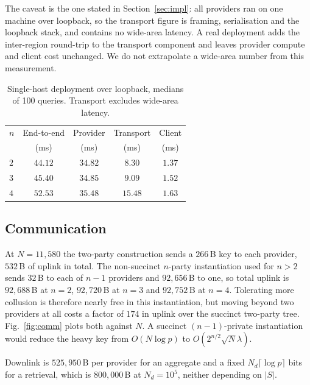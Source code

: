 \documentclass[a4paper,fleqn]{cas-dc}
\begin{document}
The caveat is the one stated in Section~\ref{sec:impl}: all providers ran on
one machine over loopback, so the transport figure is framing, serialisation
and the loopback stack, and contains no wide-area latency. A real deployment
adds the inter-region round-trip to the transport component and leaves
provider compute and client cost unchanged. We do not extrapolate a wide-area
number from this measurement.

\begin{table}[pos=t]
\caption{Single-host deployment over loopback, medians of 100 queries.
Transport excludes wide-area latency.}
\label{tab:wan}
\centering
\footnotesize
\setlength{\tabcolsep}{3pt}
\renewcommand{\arraystretch}{1.2}
\begin{tabular*}{\tblwidth}{@{\extracolsep{\fill}}lcccc@{}}
\toprule
$n$ & End-to-end & Provider & Transport & Client \\
    & (ms)       & (ms)     & (ms)      & (ms) \\
\midrule
$2$ & $44.12$ & $34.82$ & $8.30$  & $1.37$ \\
$3$ & $45.40$ & $34.85$ & $9.09$  & $1.52$ \\
$4$ & $52.53$ & $35.48$ & $15.48$ & $1.63$ \\
\bottomrule
\end{tabular*}
\end{table}

\subsection{Communication}
\label{sec:commresult}
At $N=11{,}580$ the two-party construction sends a $266$\,B key to each
provider, $532$\,B of uplink in total. The non-succinct $n$-party
instantiation used for $n>2$ sends $32$\,B to each of $n-1$ providers and
$92{,}656$\,B to one, so total uplink is $92{,}688$\,B at $n=2$,
$92{,}720$\,B at $n=3$ and $92{,}752$\,B at $n=4$. Tolerating more collusion
is therefore nearly free in this instantiation, but moving beyond two
providers at all costs a factor of $174$ in uplink over the succinct two-party
tree. Fig.~\ref{fig:comm} plots both against $N$. A succinct
$(n{-}1)$-private instantiation would reduce the heavy key from $O(N\log p)$
to $O(2^{n/2}\sqrt{N}\lambda)$.

Downlink is $525{,}950$\,B per provider for an aggregate and a fixed
$N_d\lceil\log p\rceil$ bits for a retrieval, which is $800{,}000$\,B at
$N_d=10^5$, neither depending on $|S|$.
\end{document}
